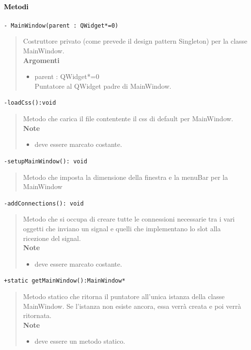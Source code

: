 \paragraph{\textcolor{black}{Metodi\\}}
\color{blue}\verb!- MainWindow(parent : QWidget*=0)!
\begin{quote}
\color{black}Costruttore privato (come prevede il design pattern\g{} Singleton) per la classe MainWindow. \\
\textbf{Argomenti}
\begin{itemize}
\item parent : QWidget*=0 \\ Puntatore al QWidget padre di MainWindow.
\end{itemize}
\end{quote}
\color{blue}\verb!-loadCss():void!
\begin{quote}
\color{black} Metodo che carica il file contentente il css di default per MainWindow. \\
\textbf{Note}
 \begin{itemize}
 \item deve essere marcato costante.
 \end{itemize}
\end{quote} 
\color{blue}\verb!-setupMainWindow(): void !
\begin{quote}
\color{black}Metodo che imposta la dimensione della finestra e la menuBar per la MainWindow
\end{quote} 
\color{blue}\verb!-addConnections(): void!
\begin{quote}
\color{black} Metodo che si occupa di creare tutte le connessioni necessarie tra i vari oggetti che inviano un signal\g{} e quelli che implementano lo slot\g{} alla ricezione del signal\g{}.\\
 \textbf{Note}
 \begin{itemize}
 \item deve essere marcato costante.
 \end{itemize}
\end{quote} 
\color{blue}\verb!+static getMainWindow():MainWindow* !
\begin{quote}
\color{black} Metodo statico che ritorna il puntatore all'unica istanza della classe MainWindow. Se l'istanza non esiste ancora, essa verrà creata e poi verrà ritornata. \\
\textbf{Note}
\begin{itemize}
\item deve essere un metodo statico.
\end{itemize}
\end{quote} 
